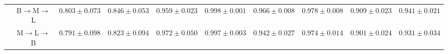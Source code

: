 \begin{table*}[ht]
{\begin{tabular}{c|c|cc|cc|cc|cc}
 & B$\rightarrow$M$\rightarrow$L & \multicolumn{1}{c|}{$0.803 \pm 0.073$} & {$0.846 \pm 0.053$} & \multicolumn{1}{c|}{$0.959 \pm 0.023$} & {$0.998 \pm 0.001$} & \multicolumn{1}{c|}{$0.966 \pm 0.008$} & {$0.978 \pm 0.008$} & \multicolumn{1}{c|}{$0.909 \pm 0.023$} & {$0.941 \pm 0.021$} \\
 & M$\rightarrow$L$\rightarrow$B & \multicolumn{1}{c|}{$0.791 \pm 0.098$} & {$0.823 \pm 0.094$} & \multicolumn{1}{c|}{$0.972 \pm 0.050$} & {$0.997 \pm 0.003$} & \multicolumn{1}{c|}{$0.942 \pm 0.027$} & {$0.974 \pm 0.014$} & \multicolumn{1}{c|}{$0.901 \pm 0.024$} & {$0.931 \pm 0.034$} \\
\bottomrule
\end{tabular}
}

\end{table*}
